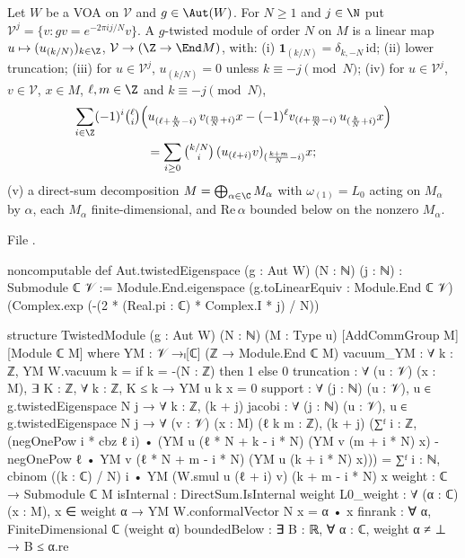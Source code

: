 \begin{definition}\label{ch07:def:twmod}
Let $W$ be a VOA on $\mathcal V$ and $g\in\Aut(W)$. For $N\ge1$ and $j\in\N$ put
$\mathcal V^j = \{v : g v = e^{-2\pi i j/N}v\}$. A $g$-twisted module of order $N$ on $M$ is a
linear map $u\mapsto (u_{(k/N)})_{k\in\Z}$, $\mathcal V\to (\Z\to\End M)$, with: (i)
$\mathbf 1_{(k/N)} = \delta_{k,-N}\,\mathrm{id}$; (ii) lower truncation; (iii) for $u\in\mathcal
V^j$, $u_{(k/N)} = 0$ unless $k\equiv -j \pmod N$; (iv) for $u\in\mathcal V^j$, $v\in\mathcal
V$, $x\in M$, $\ell, m\in \Z$ and $k\equiv -j \pmod N$,
\begin{multline}\label{ch07:eq:twjacobi}
  \sum_{i\in\Z}(-1)^i\tbinom{\ell}{i}\Bigl(u_{(\ell+\frac kN-i)}\,v_{(\frac mN+i)}x - (-1)^\ell
  v_{(\ell+\frac mN-i)}\,u_{(\frac kN+i)}x\Bigr)\\
  = \sum_{i\ge 0}\tbinom{k/N}{i}\,(u_{(\ell+i)}v)_{(\frac{k+m}{N}-i)}x;
\end{multline}
(v) a direct-sum decomposition $M = \bigoplus_{\alpha\in\C}M_\alpha$ with $\omega_{(1)} = L_0$
acting on $M_\alpha$ by $\alpha$, each $M_\alpha$ finite-dimensional, and $\mathrm{Re}\,\alpha$
bounded below on the nonzero $M_\alpha$.
\end{definition}

\noindent File .
\begin{leancode}
noncomputable def Aut.twistedEigenspace (g : Aut W) (N : ℕ) (j : ℕ) : Submodule ℂ 𝒱 :=
  Module.End.eigenspace (g.toLinearEquiv : Module.End ℂ 𝒱)
    (Complex.exp (-(2 * (Real.pi : ℂ) * Complex.I * j) / N))

structure TwistedModule (g : Aut W) (N : ℕ) (M : Type u) [AddCommGroup M] [Module ℂ M] where
  YM : 𝒱 →ₗ[ℂ] (ℤ → Module.End ℂ M)
  vacuum_YM : ∀ k : ℤ, YM W.vacuum k = if k = -(N : ℤ) then 1 else 0
  truncation : ∀ (u : 𝒱) (x : M), ∃ K : ℤ, ∀ k : ℤ, K ≤ k → YM u k x = 0
  support : ∀ (j : ℕ) (u : 𝒱), u ∈ g.twistedEigenspace N j →
    ∀ k : ℤ, (k + j) %
  jacobi : ∀ (j : ℕ) (u : 𝒱), u ∈ g.twistedEigenspace N j → ∀ (v : 𝒱) (x : M) (ℓ k m : ℤ),
    (k + j) %
    (∑ᶠ i : ℤ, (negOnePow i * cbz ℓ i) •
        (YM u (ℓ * N + k - i * N) (YM v (m + i * N) x)
          - negOnePow ℓ • YM v (ℓ * N + m - i * N) (YM u (k + i * N) x)))
      = ∑ᶠ i : ℕ, cbinom ((k : ℂ) / N) i • YM (W.smul u (ℓ + i) v) (k + m - i * N) x
  weight : ℂ → Submodule ℂ M
  isInternal : DirectSum.IsInternal weight
  L0_weight : ∀ (α : ℂ) (x : M), x ∈ weight α → YM W.conformalVector N x = α • x
  finrank : ∀ α, FiniteDimensional ℂ (weight α)
  boundedBelow : ∃ B : ℝ, ∀ α : ℂ, weight α ≠ ⊥ → B ≤ α.re
\end{leancode}

